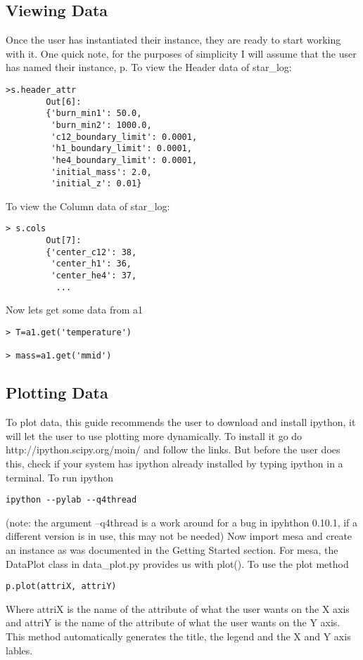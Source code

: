 \subsection{Viewing Data}
Once the user has instantiated their instance, they are ready to start working with it.
One quick note, for the purposes of simplicity I will assume that the user has named
their instance, p.
\newline
To view the Header data of star_log:
\begin{verbatim}
>s.header_attr
        Out[6]: 
        {'burn_min1': 50.0,
         'burn_min2': 1000.0,
         'c12_boundary_limit': 0.0001,
         'h1_boundary_limit': 0.0001,
         'he4_boundary_limit': 0.0001,
         'initial_mass': 2.0,
         'initial_z': 0.01}
\end{verbatim}
To view the Column data of star_log:
\begin{verbatim}
> s.cols
        Out[7]: 
        {'center_c12': 38,
         'center_h1': 36,
         'center_he4': 37,
          ...
\end{verbatim}
Now lets get some data from a1
\begin{verbatim}
> T=a1.get('temperature')

> mass=a1.get('mmid')
\end{verbatim}
\subsection{Plotting Data}
To plot data, this guide recommends the user to download and install ipython, it will let the user to use plotting more dynamically. To install it go do http://ipython.scipy.org/moin/ and follow the links.
But before the user does this, check if your system has ipython already installed by typing ipython in a terminal.
\newline
To run ipython
\begin{verbatim}
ipython --pylab --q4thread
\end{verbatim}
(note: the argument --q4thread is a work around for a bug in ipyhthon 0.10.1, if a different version is in use, this may not be needed)
\newline
Now import mesa and create an instance as was documented in the Getting Started section.
For mesa, the DataPlot class in  data\_plot.py provides us with plot().
\newline
To use the plot method
\begin{verbatim}
p.plot(attriX, attriY)
\end{verbatim}
Where attriX is the name of the attribute of what the user wants on the X axis and attriY is the name of the attribute of what the user wants on the Y axis.
This method automatically generates the title, the legend and the X and Y axis lables.

